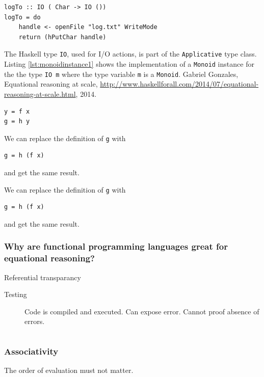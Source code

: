 \begin{verbatim}
logTo :: IO ( Char -> IO ())
logTo = do
    handle <- openFile "log.txt" WriteMode
    return (hPutChar handle)
\end{verbatim}


The Haskell type \verb|IO|, used for I/O actions, is part of the \verb|Applicative| type class. Listing \ref{lst:monoidinstance1} shows the implementation of a \verb|Monoid| instance for the the type \verb|IO m| where the type variable \verb|m| is a \verb|Monoid|. 
Gabriel Gonzales,
Equational reasoning at scale, 
\url{http://www.haskellforall.com/2014/07/equational-reasoning-at-scale.html},
2014.

\begin{verbatim}
y = f x
g = h y
\end{verbatim}
We can replace the definition of \verb|g| with
\begin{verbatim}
g = h (f x)
\end{verbatim}
and get the same result.

We can replace the definition of \verb|g| with
\begin{verbatim}
g = h (f x)
\end{verbatim}
and get the same result.

\begin{frame}
 \frametitle{Why are functional programming languages great for equational reasoning?}
Referential transparancy
\end{frame}

\begin{frame}[fragile]

  \begin{description}
  \item[Testing] Code is compiled and executed. Can expose error. Cannot proof absence of errors. 


  \end{description}
\end{frame}




\begin{frame}


\begin{Verbatim}

\end{Verbatim}

\end{frame}


\begin{frame}[fragile]
\frametitle{Associativity}
The order of evaluation must not matter.

\end{frame}
